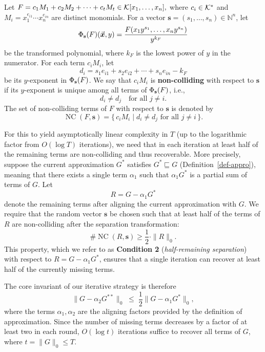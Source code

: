 \documentclass{article}
\numberwithin{equation}{section}
\begin{document}
\begin{definition}\label{def:nc}
Let 
%
$F = c_1 M_1 + c_2 M_2 + \cdots + c_t M_t \in {\mathcal{K}}[x_1, \dots, x_n],$
%
where $c_i \in {\mathcal{K}}^*$ and $M_i = x_1^{e_{i1}} \cdots x_n^{e_{in}}$ are distinct monomials. 
For a vector $\mathbf{s} = (s_1, \dots, s_n) \in \mathbb{N}^n$, let 
\[
\Phi_{\mathbf{s}}(F)(\vec{\boldsymbol{x}}, y) = \frac{F(x_1 y^{s_1}, \dots, x_n y^{s_n})}{y^{k_F}}
\]
be the transformed polynomial, where $k_F$ is the lowest power of $y$ in the numerator. 
For each term $c_i M_i$, let
\[
d_i = s_1 e_{i1} + s_2 e_{i2} + \cdots + s_n e_{in} - k_F
\]
be its $y$-exponent in $\Phi_{\mathbf{s}}(F)$. 
We say that $c_i M_i$ is \textbf{non-colliding} with respect to $\mathbf{s}$ if its $y$-exponent is unique among all terms of $\Phi_{\mathbf{s}}(F)$, i.e.,
\[
d_i \neq d_j \quad \text{for all } j \neq i.
\]
The set of non-colliding terms of $F$ with respect to $\mathbf{s}$ is denoted by
\[
\operatorname{NC}(F, \mathbf{s}) = \{\, c_i M_i \mid d_i \neq d_j \text{ for all } j \neq i \,\}.
\]
\end{definition}

For this to yield asymptotically linear complexity in $T$ (up to the logarithmic factor from $O(\log T)$ iterations), we need that in each iteration at least half of the remaining terms are non-colliding and thus recoverable. More precisely, suppose the current approximation $G^*$ satisfies $G^* \sqsubseteq G$ (Definition~\ref{def-appro}), meaning that there exists a single term $\alpha_1$ such that $\alpha_1 G^*$ is a partial sum of terms of $G$. Let
\[
R = G - \alpha_1 G^*
\]
denote the remaining terms after aligning the current approximation with $G$. We require that the random vector $\mathbf{s}$ be chosen such that at least half of the terms of $R$ are non-colliding after the separation transformation:
\[
\#\operatorname{NC}(R, \mathbf{s}) \ge \frac{1}{2} \cdot \|R\|_0.
\]
This property, which we refer to as \textbf{Condition 2} (\emph{half-remaining separation}) with respect to $R = G - \alpha_1 G^*$, ensures that a single iteration can recover at least half of the currently missing terms.

The core invariant of our iterative strategy is therefore
\[
\bigl\| G - \alpha_2 G^{**} \bigr\|_0 \;\le\; \frac{1}{2} \bigl\| G - \alpha_1 G^* \bigr\|_0,
\]
where the terms $\alpha_1, \alpha_2$ are the aligning factors provided by the definition of approximation. Since the number of missing terms decreases by a factor of at least two in each round, $O(\log t)$ iterations suffice to recover all terms of $G$, where $t = \|G\|_0 \le T$.
\end{document}
